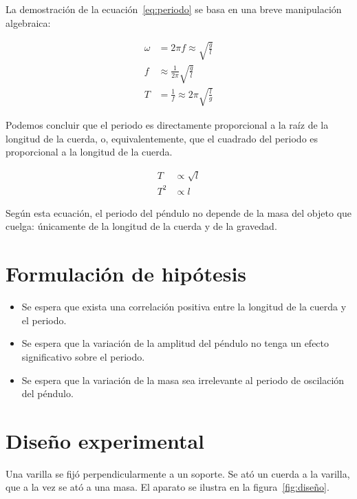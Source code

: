 \documentclass[letterpaper]{report}
\numberwithin{table}{section}
\begin{document}
La demostración de la ecuación~\eqref{eq:periodo} se basa en una
breve manipulación algebraica:

\begin{align*}
  \omega &= 2\pi f \approx \sqrt{\frac{g}{l}} \\
  f &\approx \frac{1}{2\pi}\sqrt{\frac{g}{l}} \\
  T &= \frac{1}{f} \approx 2\pi\sqrt{\frac{l}{g}}
\end{align*}

Podemos concluir que el periodo es directamente proporcional a la raíz de la
longitud de la cuerda, o, equivalentemente, que el cuadrado del periodo es
proporcional a la longitud de la cuerda.

\begin{align}
  T &\propto \sqrt{l} \\
  T^{2} &\propto l
  \label{eq:periodo_proporcionalidad}
\end{align}

Según esta ecuación, el periodo del péndulo no depende de la masa del objeto que
cuelga: únicamente de la longitud de la cuerda y de la gravedad.

\section{Formulación de hipótesis}

\begin{itemize}
  \item Se espera que exista una correlación positiva entre la longitud
    de la cuerda y el periodo.
  \item Se espera que la variación de la amplitud del péndulo no tenga un
    efecto significativo sobre el periodo.
  \item Se espera que la variación de la masa sea irrelevante al periodo
    de oscilación del péndulo.
\end{itemize}

\section{Diseño experimental}

Una varilla se fijó perpendicularmente a un soporte. Se ató un cuerda a
la varilla, que a la vez se ató a una masa. El aparato se ilustra en la
figura~\ref{fig:diseño}.
\end{document}
